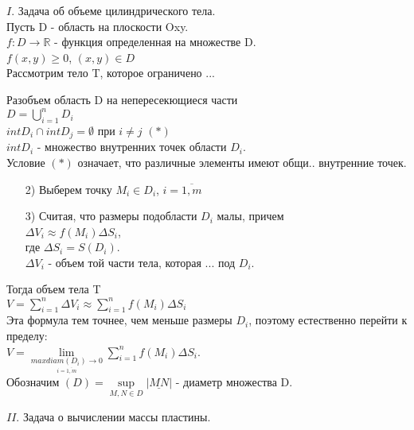 
$I.$ Задача об объеме цилиндрического тела. \\

Пусть D - область на плоскости Oxy. \\
$f: D \rightarrow \mathbb{R}$ - функция определенная на множестве D. \\
$f(x,y) \geqslant 0$, $(x,y) \in D$ \\
 
Рассмотрим тело T, которое ограничено ... 

Разобъем область D на непересекющиеся части \\
$D = \bigcup\limits_{i=1}^{n} D_i$ \\
$int D_i \cap int D_j = \emptyset$ при $i \neq j$ $(*)$ \\
$int D_i$ - множество внутренних точек области $D_i$. \\

Условие $(*)$ означает, что различные элементы имеют общи.. внутренние точек.


\begin{enumerate}
\item[2)] 
Выберем точку $M_i \in D_i$, $i = \overline{1,m}$

\item[3)] 
Считая, что размеры подобласти $D_i$ малы, причем \\
$\Delta V_i \approx f(M_i) \Delta S_i$, \\
где $\Delta S_i = S(D_i)$. \\
$\Delta V_i$ - объем той части тела, которая ... под $D_i$.
\end{enumerate}


Тогда объем тела T \\
$V = \sum\limits_{i=1}^{n} \Delta V_i \approx \sum\limits_{i=1}^{n} f(M_i) \Delta S_i$ \\
Эта формула тем точнее, чем меньше размеры $D_i$, поэтому естественно перейти к пределу: \\
$ V = \lim\limits_{\underset{i = \overline{1,m}}{max diam (D_i) \rightarrow 0}} \sum\limits_{i = 1}^{n} f(M_i) \Delta S_i$. \\
Обозначим $(D) = \sup\limits_{M,N \in D} \left| \underline{MN} \right|$ - диаметр множества D.




$II.$ Задача о вычислении массы пластины. \\ \\

